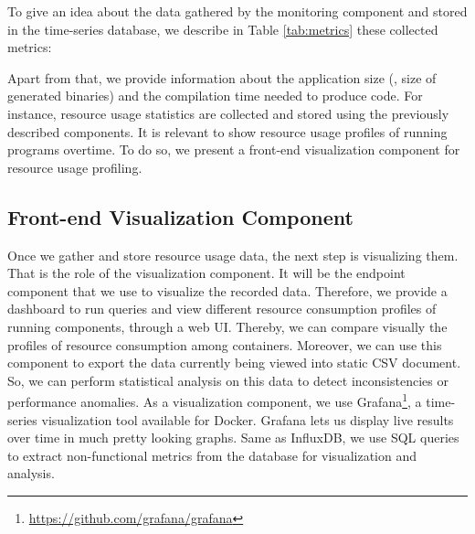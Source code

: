 To give an idea about the data gathered by the monitoring component and stored in the time-series database, we describe in Table \ref{tab:metrics} these collected metrics:
\begin{table}[h]
	\begin{center}
		
	\end{center}
	\caption {Resource usage metrics recorded in InfluxDB}
	\label{tab:metrics}
\end{table}

Apart from that, we provide information about the application size (\eg, size of generated binaries) and the compilation time needed to produce code.
For instance, resource usage statistics are collected and stored using the previously described components. It is relevant to show resource usage profiles of running programs overtime. To do so, we present a front-end visualization component for resource usage profiling. 

\subsection{Front-end Visualization Component}

Once we gather and store resource usage data, the next step is visualizing them. That is the role of the visualization component. It will be the endpoint component that we use to visualize the recorded data. Therefore, we provide a dashboard to run queries and view different resource consumption profiles of running components, through a web UI. Thereby, we can compare visually the profiles of resource consumption among containers. Moreover, we can use this component to export the data currently being viewed into static CSV document. So, we can perform statistical analysis on this data to detect inconsistencies or performance anomalies.
As a visualization component, we use Grafana\footnote{\url{https://github.com/grafana/grafana}}, a time-series visualization tool available for Docker. Grafana lets us display live results over time in much pretty looking graphs. Same as InfluxDB, we use SQL queries to extract non-functional metrics from the database for visualization and analysis.

